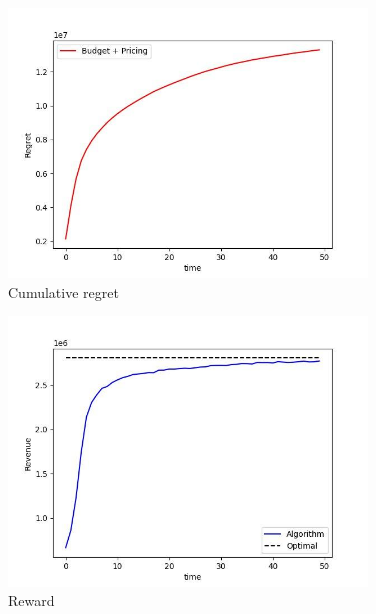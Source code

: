 \begin{figure}
    \caption{Cumulative regret}
    \label{fig:opt_constrained_regret}
    \includegraphics[width=0.85\textwidth]{sections/images/opt_constrained_regret.jpg}
\end{figure}

\begin{figure}
    \caption{Reward}
    \label{fig:opt_constrained_reward}
    \includegraphics[width=0.85\textwidth]{sections/images/opt_constrained_reward.jpg}
\end{figure}